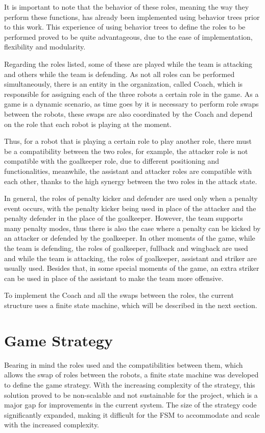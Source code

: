 It is important to note that the behavior of these roles, meaning the way they perform these functions, has already been implemented using behavior trees prior to this work. This experience of using behavior trees to define the roles to be performed proved to be quite advantageous, due to the ease of implementation, flexibility and modularity.

Regarding the roles listed, some of these are played while the team is attacking and others while the team is defending. As not all roles can be performed simultaneously, there is an entity in the organization, called Coach, which is responsible for assigning each of the three robots a certain role in the game. As a game is a dynamic scenario, as time goes by it is necessary to perform role swaps between the robots, these swaps are also coordinated by the Coach and depend on the role that each robot is playing at the moment.

Thus, for a robot that is playing a certain role to play another role, there must be a compatibility between the two roles, for example, the attacker role is not compatible with the goalkeeper role, due to different positioning and functionalities, meanwhile, the assistant and attacker roles are compatible with each other, thanks to the high synergy between the two roles in the attack state.

In general, the roles of penalty kicker and defender are used only when a penalty event occurs, with the penalty kicker being used in place of the attacker and the penalty defender in the place of the goalkeeper. However, the team supports many penalty modes, thus there is also the case where a penalty can be kicked by an attacker or defended by the goalkeeper. In other moments of the game, while the team is defending, the roles of goalkeeper, fullback and wingback are used and while the team is attacking, the roles of goalkeeper, assistant and striker are usually used. Besides that, in some special moments of the game, an extra striker can be used in place of the assistant to make the team more offensive.

To implement the Coach and all the swaps between the roles, the current structure uses a finite state machine, which will be described in the next section.

\section{Game Strategy}

Bearing in mind the roles used and the compatibilities between them, which allows the swap of roles between the robots, a finite state machine was developed to define the game strategy. With the increasing complexity of the strategy, this solution proved to be non-scalable and not sustainable for the project, which is a major gap for improvements in the current system. The size of the strategy code significantly expanded, making it difficult for the FSM to accommodate and scale with the increased complexity.

